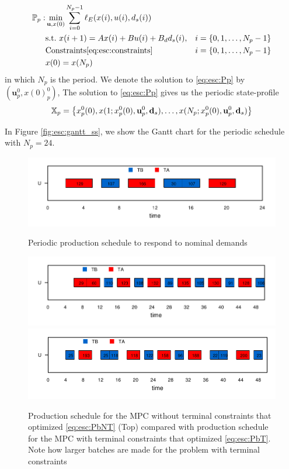 \begin{alignat}{2}
\label{eq:esc:Pp}
\mathbb{P}_p:& \min_{\mathbf{u},x(0)}{\sum_{i=0}^{N_p-1}\ell_E(x(i),u(i),d_s(i))}& \nonumber \\
&\text{s.t.~} x(i+1) = Ax(i) + Bu(i)+B_dd_s(i),&i = \left\lbrace 0,1,\ldots,N_p-1 \right\rbrace \\
& \text{Constraints}\eqref{eq:esc:constraints}&i = \left\lbrace 0,1,\ldots,N_p-1 \right\rbrace \nonumber\\
& x(0) = x(N_p)& \nonumber\\
\end{alignat}
in which $N_p$ is the period.  We denote the solution to
\eqref{eq:esc:Pp} by $(\mathbf{u}_p^0,x(0)_p^0)$,
The solution to \eqref{eq:esc:Pp} gives us the periodic state-profile
\begin{equation}
\label{eq:esc:Xperiodic}
\mathbb{X}_p =  \left\lbrace x^0_p(0),x(1;x^0_p(0),\mathbf{u}_p^0,\mathbf{d}_s),\ldots,x(N_p;x^0_p(0),\mathbf{u}_p^0,\mathbf{d}_s)  \right\rbrace
\end{equation}

In Figure \ref{fig:esc:gantt_ss}, we show the Gantt chart for the periodic
schedule with $N_p = 24$.

\begin{figure}
\centering
\scriptsize
\centering
\includegraphics{esc/SS_gantt.pdf}
\caption{Periodic production schedule to respond to nominal demands}
\label{fig:esc:gantt_ss}

\label{fig:esc:ganttTNT1}
\begin{center}
\includegraphics{esc/NTS_gantt.pdf}
\includegraphics{esc/TS_gantt.pdf}
\caption{Production schedule for the MPC without terminal constraints that optimized
  \eqref{eq:esc:PbNT} (Top) compared with production schedule for the MPC
  with terminal constraints that optimized \eqref{eq:esc:PbT}. Note how larger batches are made for
  the problem with terminal constraints}
\end{center}
\end{figure}

